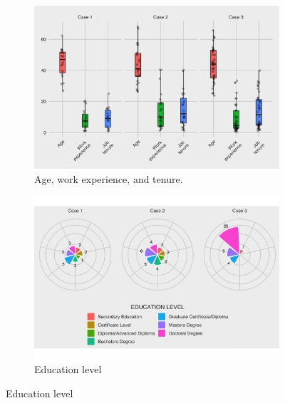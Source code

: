 \begin{figure}[hbt!]
\centering
\begin{subfigure}[b]{0.7\textwidth}
\includegraphics[width=1\linewidth]{Images/age_demographics.png}
\caption{Age, work experience, and tenure.}
\end{subfigure}

\begin{subfigure}[b]{0.7\textwidth}
\includegraphics[width=1\linewidth]{Images/ed_level.png}
\caption{Education level}
\end{subfigure}


\end{figure}
